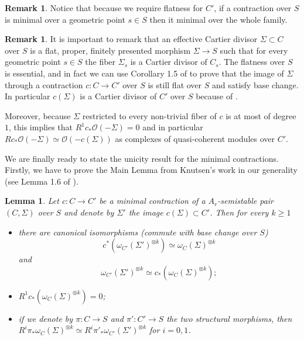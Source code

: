 \documentclass{alggeom}
\numberwithin{equation}{section}
\numberwithin{subsection}{section}
\newtheorem{lemma}[theorem]{Lemma}
\theoremstyle{definition}
\newtheorem{remark}[theorem]{Remark}
\theoremstyle{remark}
\newcommand\cO{\mathcal{O}} \newcommand\cP{\mathcal{P}}
\begin{document}
\begin{remark}
 Notice that because we require flatness for $C'$, if a contraction over $S$ is minimal over a geometric point $s \in S$ then it minimal over the whole family.
\end{remark}

\begin{remark}\label{rem:cart-div-fam}
 It is important to remark that an effective Cartier divisor $\Sigma \subset C$ over $S$ is a flat, proper, finitely presented morphism $\Sigma \rightarrow S$ such that for every geometric point $s \in S$ the fiber $\Sigma_s$ is a Cartier divisor of $C_s$. The flatness over $S$ is essential, and in fact we can use Corollary 1.5 of \cite{Knu} to prove that the image of $\Sigma$ through a contraction $c:C \rightarrow C'$ over $S$ is still flat over $S$ and satisfy base change. In particular $c(\Sigma)$ is a Cartier divisor of $C'$ over $S$ because of .
 
 Moreover, because $\Sigma$ restricted to every non-trivial fiber of $c$ is at most of degree $1$, this implies that $R^1c_*\cO(-\Sigma)=0$ and in particular $Rc_*\cO(-\Sigma)\simeq\cO(-c(\Sigma))$ as complexes of quasi-coherent modules over $C'$.
\end{remark}

We are finally ready to state the unicity result for the minimal contractions. Firstly, we have to prove the Main Lemma from Knutsen's work in our generality (see Lemma 1.6 of \cite{Knu}). 

\begin{lemma}\label{lem:main-lemma}
 Let $c:C \rightarrow C'$ be a minimal contraction of a $A_r$-semistable pair $(C,\Sigma)$ over $S$ and denote by $\Sigma'$ the image $c(\Sigma)\subset C'$. Then for every $k\geq 1$
 \begin{itemize}
  \item[(a)] there are canonical isomorphisms (commute with base change over $S$)
  $$ c^*(\omega_{C'}(\Sigma')^{\otimes k}) \simeq \omega_{C}(\Sigma)^{\otimes k}$$
  and 
   $$ \omega_{C'}(\Sigma')^{\otimes k} \simeq c_*(\omega_{C}(\Sigma)^{\otimes k});$$
   \item[(b)] $ R^1c_*(\omega_{C}(\Sigma)^{\otimes k})=0$;
   \item[(c)] if we denote by $\pi:C\rightarrow S$ and $\pi':C' \rightarrow S$ the two structural morphisms, then $R^i\pi_*\omega_{C}(\Sigma)^{\otimes k}\simeq R^i\pi'_*\omega_{C'}(\Sigma')^{\otimes k}$ for $i=0,1$. 
 \end{itemize}

\end{lemma}
\end{document}
